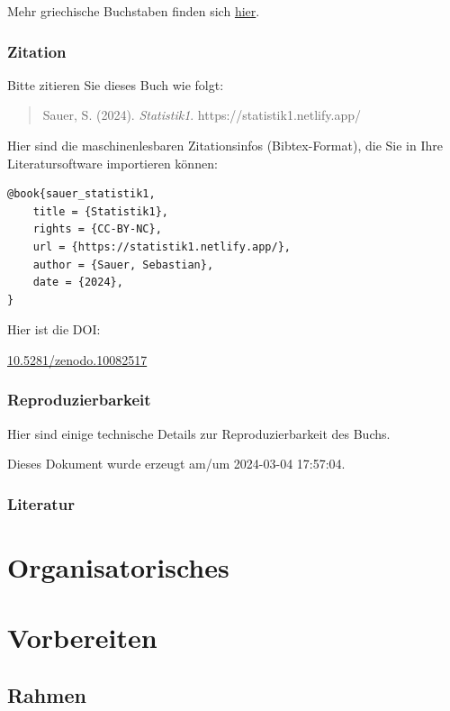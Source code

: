 \documentclass[
  a4paper,
  DIV=11]{scrreprt}
\theoremstyle{definition}
\theoremstyle{definition}
\theoremstyle{definition}
\theoremstyle{remark}
\begin{document}
Mehr griechische Buchstaben finden sich
\href{https://de.wikipedia.org/wiki/Griechisches_Alphabet}{hier}.

\section{Zitation}\label{zitation}

Bitte zitieren Sie dieses Buch wie folgt:

\begin{quote}
Sauer, S. (2024). \emph{Statistik1}. https://statistik1.netlify.app/
\end{quote}

Hier sind die maschinenlesbaren Zitationsinfos (Bibtex-Format), die Sie
in Ihre Literatursoftware importieren können:

\begin{verbatim}
@book{sauer_statistik1,
    title = {Statistik1},
    rights = {CC-BY-NC},
    url = {https://statistik1.netlify.app/},
    author = {Sauer, Sebastian},
    date = {2024},
}
\end{verbatim}

Hier ist die DOI:

\href{https://zenodo.org/doi/10.5281/zenodo.10082517}{10.5281/zenodo.10082517}

\section{Reproduzierbarkeit}\label{reproduzierbarkeit}

Hier sind einige technische Details zur Reproduzierbarkeit des Buchs.

Dieses Dokument wurde erzeugt am/um 2024-03-04 17:57:04.

\section{Literatur}\label{literatur}

\part{Organisatorisches}

\part{Vorbereiten}

\chapter{Rahmen}\label{rahmen}
\end{document}
